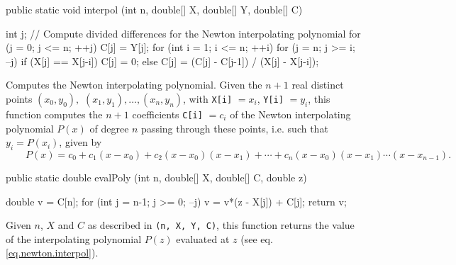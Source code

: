 \begin{code}

   public static void interpol (int n, double[] X, double[] Y, double[] C)\begin{hide} {
      int j;
      // Compute divided differences for the Newton interpolating polynomial
      for (j = 0; j <= n; ++j)
         C[j] = Y[j];
      for (int i = 1; i <= n; ++i)
         for (j = n; j >= i; --j) {
            if (X[j] == X[j-i])
               C[j] = 0;
            else
               C[j] = (C[j] - C[j-1]) / (X[j] - X[j-i]);
         }
   }\end{hide}
\end{code}
\begin{tabb} Computes the Newton interpolating polynomial.  Given the $n+1$
 real distinct points $(x_0, y_0),$ $(x_1, y_1),\ldots, (x_n, y_n)$,
  with \texttt{X[i]} $= x_i$, \texttt{Y[i]} $= y_i$, this function computes
  the $n+1$ coefficients \texttt{C[i]} $= c_i$ of the Newton
  interpolating polynomial $P(x)$ of degree $n$ passing through these points,
  i.e. such that $y_i= P(x_i)$, given by
\begin{equation}
\qquad  P(x) = c_0 + c_1(x-x_0) + c_2(x-x_0)(x-x_1) + \cdots +
    c_n(x-x_0)(x-x_1) \cdots(x-x_{n-1}).    \label{eq.newton.interpol}
\end{equation}
\end{tabb}
\begin{htmlonly}
\end{htmlonly}
\begin{code}

   public static double evalPoly (int n, double[] X, double[] C, double z) \begin{hide} {
      double v = C[n];
      for (int j = n-1; j >= 0; --j)
         v = v*(z - X[j]) + C[j];
      return v;
   }\end{hide}
\end{code}
\begin{tabb} Given $n$, $X$ and $C$ as described in
 \texttt{(n, X, Y, C)}, this
function returns the value of the interpolating polynomial $P(z)$ evaluated
 at $z$ (see eq. \ref{eq.newton.interpol}).
\end{tabb}
\begin{htmlonly}
\end{htmlonly}
